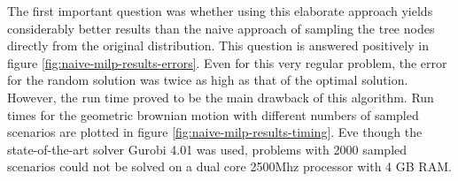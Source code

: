 The first important question was whether using this elaborate approach yields considerably better results than the naive approach of sampling the tree nodes directly from the original distribution.
This question is answered positively in figure \ref{fig:naive-milp-results-errors}.
Even for this very regular problem, the error for the random solution was twice as high as that of the optimal solution.
However, the run time proved to be the main drawback of this algorithm.
Run times for the geometric brownian motion with different numbers of sampled scenarios are plotted in figure \ref{fig:naive-milp-results-timing}.
Eve though the state-of-the-art solver Gurobi 4.01 was used, problems with 2000 sampled scenarios could not be solved on a dual core 2500Mhz processor with 4 GB RAM.

